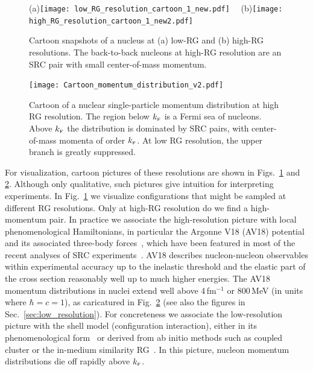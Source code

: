 \documentclass[10pt,aps,prc,floatfix,twocolumn,nofootinbib]{revtex4-1}
\begin{document}
\begin{figure}[tbh]
    \centering
    (a)\texttt{[image: low\_RG\_resolution\_cartoon\_1\_new.pdf]}~~%
    (b)\texttt{[image: high\_RG\_resolution\_cartoon\_1\_new2.pdf]}
    \caption{Cartoon snapshots of a nucleus at (a) low-RG  and (b) high-RG resolutions. 
    The back-to-back nucleons at high-RG resolution are an SRC pair with small center-of-mass momentum.
    }
    \label{fig:cartoon_nuclei}
\end{figure}

\begin{figure}[tbh]
    \centering
    \texttt{[image: Cartoon\_momentum\_distribution\_v2.pdf]}
    \caption{Cartoon of a nuclear single-particle momentum distribution at high RG resolution.
    The region below $k_{\scriptscriptstyle{\text F}}$ is a Fermi sea of nucleons.
    Above $k_{\scriptscriptstyle{\text F}}$ the distribution is dominated by SRC pairs, with center-of-mass momenta of order $k_{\scriptscriptstyle{\text F}}$.
    At low RG resolution, the upper branch is greatly suppressed.
    }
    \label{fig:cartoon_mom_dist}
\end{figure}

For visualization, cartoon pictures of these resolutions are shown in Figs.~\ref{fig:cartoon_nuclei} and \ref{fig:cartoon_mom_dist}.
Although only qualitative, such pictures give intuition for interpreting experiments.
In Fig.~\ref{fig:cartoon_nuclei} we visualize configurations that might be sampled at different RG resolutions. Only at high-RG resolution do we find a high-momentum pair.
In practice we associate the high-resolution picture with local phenomenological Hamiltonians, in particular the Argonne V18 (AV18) potential~\cite{Wiringa:1994wb} and its associated three-body forces~\cite{Carlson:1983kq,Pieper:2001ap}, which have been featured in most of the recent analyses of SRC experiments~\cite{Hen:2016kwk}. 
AV18 describes nucleon-nucleon observables within experimental accuracy up to the inelastic threshold and the elastic part of the cross section reasonably well up to much higher energies.
The AV18 momentum distributions in nuclei extend well above 4\,fm$^{-1}$ or 800\,MeV (in units where $\hbar = c = 1$), as caricatured in Fig.~\ref{fig:cartoon_mom_dist} (see also the figures in Sec.~\ref{sec:low_resolution}).
For concreteness we associate the low-resolution picture with the shell model (configuration interaction), either in its phenomenological form~\cite{Heyde:2004zz,Ring:2005} or derived from ab initio methods such as coupled cluster or the in-medium similarity RG~\cite{Hergert:2020bxy}.
In this picture, nucleon momentum distributions die off rapidly above $k_{\scriptscriptstyle{\text F}}$.
\end{document}
